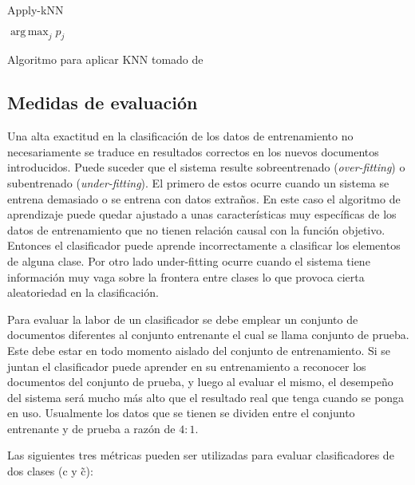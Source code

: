 \documentclass{llncs}
\DeclareMathOperator*{\argmax}{arg\,max}
\begin{document}
		\begin{algorithm}{}
			\caption{Apply-kNN}
			\begin{algorithmic}[1]
				
				\EndFor
				\State \textbf{\Return} $\argmax_j p_j$
			\end{algorithmic}
				
			\smallskip
			\tiny{Algoritmo para aplicar KNN tomado de \cite[Figura 14.7]{B1}}
		\end{algorithm}
		
		
	\subsection{Medidas de evaluaci\'on}
			
			Una alta exactitud en la clasificaci\'on de los datos de entrenamiento no necesariamente se traduce en resultados correctos en los nuevos documentos introducidos. Puede suceder que el sistema resulte sobreentrenado (\emph{over-fitting}) o subentrenado (\emph{under-fitting}). El primero de estos ocurre cuando un sistema se entrena demasiado o se entrena con datos extra\~nos. En este caso el algoritmo de aprendizaje puede quedar ajustado a unas caracter\'isticas muy espec\'ificas de los datos de entrenamiento que no tienen relaci\'on causal con la funci\'on objetivo. Entonces el clasificador puede aprende incorrectamente a clasificar los elementos de alguna clase. Por otro lado under-fitting ocurre cuando el sistema tiene informaci\'on muy vaga sobre la frontera entre clases lo que provoca cierta aleatoriedad en la clasificaci\'on.
			
			Para evaluar la labor de un clasificador se debe emplear un conjunto de documentos diferentes al conjunto entrenante el cual se llama conjunto de prueba. Este debe estar en todo momento aislado del conjunto de entrenamiento. Si se juntan el clasificador puede aprender en su entrenamiento a reconocer los documentos del conjunto de prueba, y luego  al evaluar el mismo, el desempe\~no del sistema ser\'a mucho m\'as alto que el resultado real que tenga cuando se ponga en uso. Usualmente los datos que se tienen se dividen entre el conjunto entrenante y de prueba a raz\'on de $4:1$.
			
			Las siguientes tres m\'etricas pueden ser utilizadas para evaluar clasificadores de dos clases (c y \~c):	
					
\end{document}
